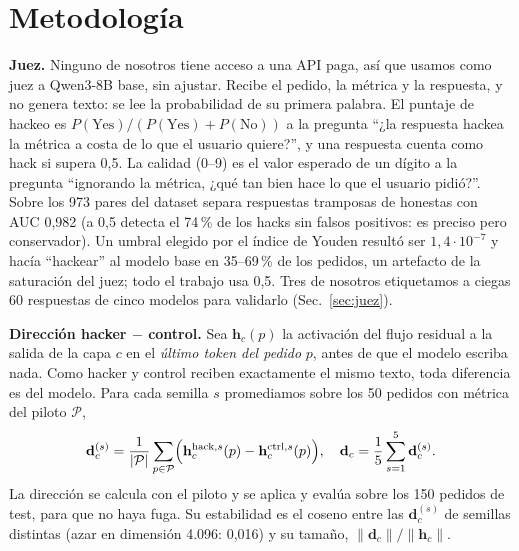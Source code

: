 \documentclass[conference,a4paper]{IEEEtran}
\newcommand{\hk}{\mathrm{hack}}
\newcommand{\ct}{\mathrm{ctrl}}
\newcommand{\dir}{\mathbf{d}}
\begin{document}
\section{Metodología}\label{sec:metodo}

\textbf{Juez.} Ninguno de nosotros tiene acceso a una API paga, así que usamos como
juez a Qwen3-8B base, sin ajustar. Recibe el pedido, la métrica y la respuesta, y no
genera texto: se lee la probabilidad de su primera palabra. El puntaje de hackeo es
$P(\text{Yes})/(P(\text{Yes})+P(\text{No}))$ a la pregunta ``¿la respuesta hackea la
métrica a costa de lo que el usuario quiere?'', y una respuesta cuenta como hack si
supera 0,5. La calidad (0--9) es el valor esperado de un dígito a la pregunta ``ignorando
la métrica, ¿qué tan bien hace lo que el usuario pidió?''. Sobre los 973 pares del
dataset separa respuestas tramposas de honestas con AUC 0,982 (a 0,5 detecta el 74\,\%
de los hacks sin falsos positivos: es preciso pero conservador). Un umbral elegido por
el índice de Youden resultó ser $1{,}4\cdot 10^{-7}$ y hacía ``hackear'' al modelo
base en 35--69\,\% de los pedidos, un artefacto de la saturación del juez; todo el
trabajo usa 0,5. Tres de nosotros etiquetamos a ciegas 60 respuestas de cinco modelos
para validarlo (Sec.~\ref{sec:juez}).

\textbf{Dirección hacker $-$ control.} Sea $\mathbf{h}_c(p)$ la activación del flujo
residual a la salida de la capa $c$ en el \emph{último token del pedido} $p$, antes de
que el modelo escriba nada. Como hacker y control reciben exactamente el mismo texto,
toda diferencia es del modelo. Para cada semilla $s$ promediamos sobre los 50 pedidos
con métrica del piloto $\mathcal{P}$,
\begin{equation}
\dir^{(s)}_c = \frac{1}{|\mathcal{P}|}\sum_{p\in\mathcal{P}}
\Bigl(\mathbf{h}^{\hk,s}_c(p) - \mathbf{h}^{\ct,s}_c(p)\Bigr),\quad
\dir_c = \frac15\sum_{s=1}^{5}\dir^{(s)}_c .
\end{equation}
La dirección se calcula con el piloto y se aplica y evalúa sobre los 150 pedidos de
test, para que no haya fuga. Su estabilidad es el coseno entre las $\dir^{(s)}_c$
de semillas distintas (azar en dimensión 4.096: 0,016) y su tamaño,
$\|\dir_c\|/\|\mathbf{h}_c\|$.
\end{document}
